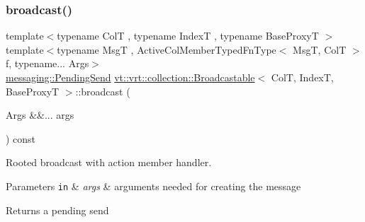 \mbox{\label{structvt_1_1vrt_1_1collection_1_1_broadcastable_a96cd21a1be6313144a8c4aa3683eaa05}} 
\subsubsection{\texorpdfstring{broadcast()}{broadcast()}\hspace{0.1cm}{\footnotesize\ttfamily [6/7]}}
{\footnotesize\ttfamily template$<$typename ColT , typename IndexT , typename Base\+ProxyT $>$ \\
template$<$typename MsgT , Active\+Col\+Member\+Typed\+Fn\+Type$<$ Msg\+T, Col\+T $>$ f, typename... Args$>$ \\
\hyperlink{structvt_1_1messaging_1_1_pending_send}{messaging\+::\+Pending\+Send} \hyperlink{structvt_1_1vrt_1_1collection_1_1_broadcastable}{vt\+::vrt\+::collection\+::\+Broadcastable}$<$ ColT, IndexT, Base\+ProxyT $>$\+::broadcast (\begin{DoxyParamCaption}\item[{Args \&\&...}]{args }\end{DoxyParamCaption}) const}



Rooted broadcast with action member handler. 


\begin{DoxyParams}[1]{Parameters}
\mbox{\tt in}  & {\em args} & arguments needed for creating the message\\
\hline
\end{DoxyParams}
\begin{DoxyReturn}{Returns}
a pending send 
\end{DoxyReturn}
\mbox{\label{structvt_1_1vrt_1_1collection_1_1_broadcastable_af8df39dc496fd4caffd029a714369610}} 
